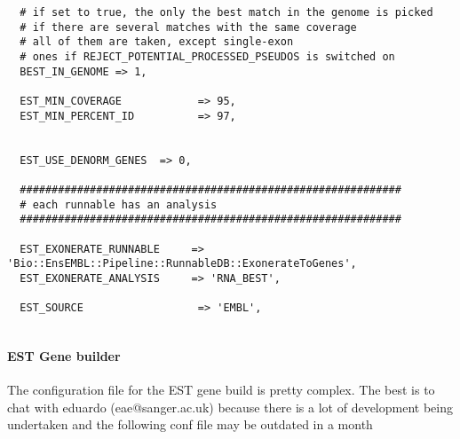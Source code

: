 \documentclass[a4paper,10pt]{article}
\begin{document}
\begin{verbatim}
  # if set to true, the only the best match in the genome is picked
  # if there are several matches with the same coverage
  # all of them are taken, except single-exon 
  # ones if REJECT_POTENTIAL_PROCESSED_PSEUDOS is switched on 
  BEST_IN_GENOME => 1,
  
  EST_MIN_COVERAGE            => 95,
  EST_MIN_PERCENT_ID          => 97,
  

  EST_USE_DENORM_GENES	=> 0,
  
  ############################################################
  # each runnable has an analysis
  ############################################################
  
  EST_EXONERATE_RUNNABLE     => 'Bio::EnsEMBL::Pipeline::RunnableDB::ExonerateToGenes',      
  EST_EXONERATE_ANALYSIS     => 'RNA_BEST',
  
  EST_SOURCE                  => 'EMBL',      
  
\end{verbatim}

\paragraph{EST Gene builder}
The configuration file for the EST gene build is pretty complex. The best is to chat with eduardo (eae@sanger.ac.uk) because there is a lot of development being undertaken and the following conf file may be outdated in a month 
\end{document}
